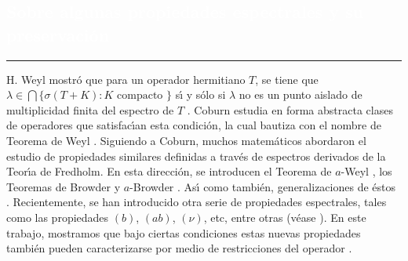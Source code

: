 \begin{titlepage}
\pagecolor{white}
\BgThispage
{}
\vspace*{-1.1cm}
\noindent
\def\titulo#1{\section{#1}}
\section{\bf\large\textcolor{white}{Sobre algunas propiedades espectrales y su preservaci\'{o}n}}
\vspace*{2cm}\par
\noindent

\begin{minipage}{0.5\linewidth}
\begin{minipage}{0.45\linewidth}
    \begin{flushright}
        \printauthor
    \end{flushright}
\end{minipage} \hspace{0pt}
%
\begin{minipage}{0.02\linewidth}
      \color{ptctitle} \rule{1pt}{175pt}
\end{minipage} 
\end{minipage}
\hspace*{-4.5cm}
%
\begin{minipage}{0.85\linewidth}
\begin{minipage}{0.85\linewidth}
\footnotesize
\vspace{5pt}
    \begin{resumen}    
H. Weyl mostr\'{o} que para un operador hermitiano $T$, se tiene que $\lambda\in\bigcap\{\sigma (T+K): K\mbox{ compacto }\}$ s\'{\i} y s\'{o}lo si $\lambda$ no es un punto aislado de multiplicidad finita del espectro de $T$ \cite{WH}. Coburn estudia en forma abstracta clases de operadores que satisfac\'{\i}an esta condici\'{o}n, la cual bautiza con el nombre de Teorema de Weyl \cite{CL}. Siguiendo a Coburn, muchos matem\'{a}ticos abordaron el estudio de propiedades similares definidas a trav\'{e}s de espectros derivados de la Teor\'{\i}a de Fredholm. En esta direcci\'{o}n, se introducen el Teorema de $a$-Weyl \cite{Ra}, los Teoremas de Browder y $a$-Browder \cite{HL}. As\'{\i} como tambi\'{e}n, generalizaciones de \'{e}stos \cite{BK}. Recientemente, se han introducido otra serie de propiedades espectrales, tales como las propiedades $(b)$, $(ab)$, $(\nu)$, etc, entre otras (v\'{e}ase \cite{San}). En este trabajo, mostramos que bajo ciertas condiciones estas nuevas propiedades tambi\'{e}n pueden  caracterizarse por medio de restricciones del operador \cite{CRRMA}.
    \end{resumen}
   \end{minipage}
   \vspace{10pt}
\end{minipage}
\vspace{10pt}\\[5pt]
\begin{thebibliography}{99}



\end{thebibliography}
\end{titlepage}
